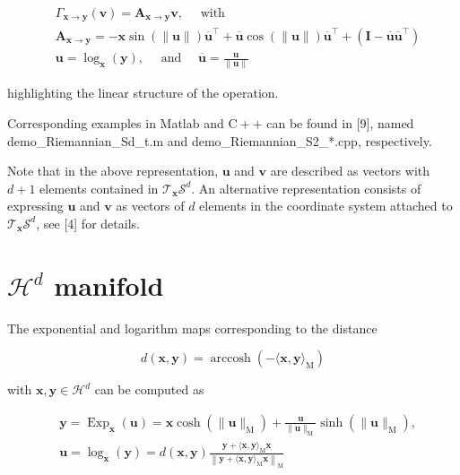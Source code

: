 \documentclass[10pt]{article}
\begin{document}
$$
\begin{aligned}
& \Gamma_{\boldsymbol{x} \rightarrow \boldsymbol{y}}(\boldsymbol{v})=\boldsymbol{A}_{\boldsymbol{x} \rightarrow \boldsymbol{y}} \boldsymbol{v}, \quad \text { with } \\
& \boldsymbol{A}_{\boldsymbol{x} \rightarrow \boldsymbol{y}}=-\boldsymbol{x} \sin (\|\boldsymbol{u}\|) \overline{\boldsymbol{u}}^{\top}+\overline{\boldsymbol{u}} \cos (\|\boldsymbol{u}\|) \overline{\boldsymbol{u}}^{\top}+\left(\boldsymbol{I}-\overline{\boldsymbol{u}} \overline{\boldsymbol{u}}^{\top}\right) \\
& \boldsymbol{u}=\log _{\boldsymbol{x}}(\boldsymbol{y}), \quad \text { and } \quad \overline{\boldsymbol{u}}=\frac{\boldsymbol{u}}{\|\boldsymbol{u}\|}
\end{aligned}
$$

highlighting the linear structure of the operation.

Corresponding examples in Matlab and $\mathrm{C}++$ can be found in [9], named demo\_Riemannian\_Sd\_t.m and demo\_Riemannian\_S2\_*.cpp, respectively.

Note that in the above representation, $\boldsymbol{u}$ and $\boldsymbol{v}$ are described as vectors with $d+1$ elements contained in $\mathcal{T}_{\boldsymbol{x}} \mathcal{S}^{d}$. An alternative representation consists of expressing $\boldsymbol{u}$ and $\boldsymbol{v}$ as vectors of $d$ elements in the coordinate system attached to $\mathcal{T}_{\boldsymbol{x}} \mathcal{S}^{d}$, see [4] for details.

\section{$\mathcal{H}^{d}$ manifold}
The exponential and logarithm maps corresponding to the distance

$$
d(\boldsymbol{x}, \boldsymbol{y})=\operatorname{arccosh}\left(-\langle\boldsymbol{x}, \boldsymbol{y}\rangle_{\mathrm{M}}\right)
$$

with $\boldsymbol{x}, \boldsymbol{y} \in \mathcal{H}^{d}$ can be computed as

$$
\begin{aligned}
& \boldsymbol{y}=\operatorname{Exp}_{\boldsymbol{x}}(\boldsymbol{u})=\boldsymbol{x} \cosh \left(\|\boldsymbol{u}\|_{\mathrm{M}}\right)+\frac{\boldsymbol{u}}{\|\boldsymbol{u}\|_{\mathrm{M}}} \sinh \left(\|\boldsymbol{u}\|_{\mathrm{M}}\right), \\
& \boldsymbol{u}=\log _{\boldsymbol{x}}(\boldsymbol{y})=d(\boldsymbol{x}, \boldsymbol{y}) \frac{\boldsymbol{y}+\langle\boldsymbol{x}, \boldsymbol{y}\rangle_{\mathrm{M}} \boldsymbol{x}}{\left\|\boldsymbol{y}+\langle\boldsymbol{x}, \boldsymbol{y}\rangle_{\mathrm{M}} \boldsymbol{x}\right\|_{\mathrm{M}}}
\end{aligned}
$$
\end{document}
